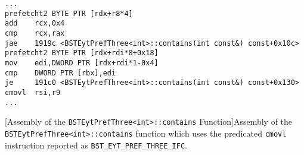 \begin{lstlisting}
...
prefetcht2 BYTE PTR [rdx+r8*4]
add    rcx,0x4
cmp    rcx,rax
jae    1919c <BSTEytPrefThree<int>::contains(int const&) const+0x10c>
prefetcht2 BYTE PTR [rdx+rdi*8+0x18]
mov    edi,DWORD PTR [rdx+rdi*1-0x4]
cmp    DWORD PTR [rbx],edi
je     191c0 <BSTEytPrefThree<int>::contains(int const&) const+0x130>
cmovl  rsi,r9
...
\end{lstlisting}
[Assembly of the \texttt{BSTEytPrefThree<int>::contains} Function]{Assembly of the \texttt{BSTEytPrefThree<int>::contains} function which uses the predicated \texttt{cmovl} instruction reported as \texttt{BST\_EYT\_PREF\_THREE\_IFC}.}
\label{lst:asm-preftwocmov}